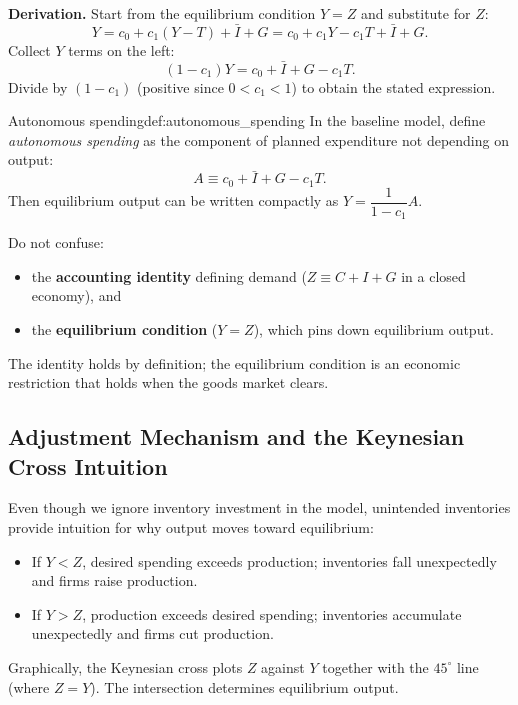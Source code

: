 \noindent
\textbf{Derivation.} Start from the equilibrium condition $Y=Z$ and substitute for $Z$:
\[
Y = c_0 + c_1(Y-T) + \bar I + G
  = c_0 + c_1Y - c_1T + \bar I + G.
\]
Collect $Y$ terms on the left:
\[
(1-c_1)Y = c_0 + \bar I + G - c_1T.
\]
Divide by $(1-c_1)$ (positive since $0<c_1<1$) to obtain the stated expression.

\begin{definition}{Autonomous spending}{def:autonomous_spending}
In the baseline model, define \emph{autonomous spending} as the component of planned expenditure not
depending on output:
\[
A \equiv c_0 + \bar I + G - c_1T.
\]
Then equilibrium output can be written compactly as $Y=\dfrac{1}{1-c_1}A$.
\end{definition}

\begin{commonmistake}
Do not confuse:
\begin{itemize}
\item the \textbf{accounting identity} defining demand ($Z \equiv C+I+G$ in a closed economy), and
\item the \textbf{equilibrium condition} ($Y=Z$), which pins down equilibrium output.
\end{itemize}
The identity holds by definition; the equilibrium condition is an economic restriction that holds when the goods market clears.
\end{commonmistake}

\subsection{Adjustment Mechanism and the Keynesian Cross Intuition}

\noindent
Even though we ignore inventory investment in the model, unintended inventories provide intuition for why output
moves toward equilibrium:
\begin{itemize}
\item If $Y<Z$, desired spending exceeds production; inventories fall unexpectedly and firms raise production.
\item If $Y>Z$, production exceeds desired spending; inventories accumulate unexpectedly and firms cut production.
\end{itemize}

\noindent
Graphically, the Keynesian cross plots $Z$ against $Y$ together with the $45^\circ$ line (where $Z=Y$).
The intersection determines equilibrium output.

